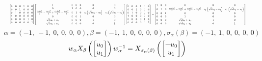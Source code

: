 \documentclass[11pt]{article}
\theoremstyle{definition}
\begin{document}
\[
\scaletoalign{\textwidth}{{\left[\begin{matrix}0 & 0 & 0 & 1 & 0 & 0\\0 & 0 & 1 & 0 & 0 & 0\\0 & 1 & 0 & 0 & 0 & 0\\1 & 0 & 0 & 0 & 0 & 0\\0 & 0 & 0 & 0 & 1 & 0\\0 & 0 & 0 & 0 & 0 & 1\end{matrix}\right]} {\left[\begin{matrix}1 & 0 & 0 & 0 & 0 & 0\\0 & 1 & 0 & 0 & 0 & 0\\\frac{c_{0} d u_{0}^{2}}{2} - \frac{c_{0} u_{2}^{2}}{2} + \frac{c_{1} d u_{3}^{2}}{2} - \frac{c_{1} u_{1}^{2}}{2} & 0 & 1 & 0 & c_{0} \left(\sqrt{d} u_{0} - u_{2}\right) & c_{1} \left(\sqrt{d} u_{3} - u_{1}\right)\\0 & 0 & 0 & 1 & 0 & 0\\\sqrt{d} u_{0} + u_{2} & 0 & 0 & 0 & 1 & 0\\\sqrt{d} u_{3} + u_{1} & 0 & 0 & 0 & 0 & 1\end{matrix}\right]} {\left[\begin{matrix}0 & 0 & 0 & 1 & 0 & 0\\0 & 0 & 1 & 0 & 0 & 0\\0 & 1 & 0 & 0 & 0 & 0\\1 & 0 & 0 & 0 & 0 & 0\\0 & 0 & 0 & 0 & 1 & 0\\0 & 0 & 0 & 0 & 0 & 1\end{matrix}\right]} = {\left[\begin{matrix}1 & 0 & 0 & 0 & 0 & 0\\0 & 1 & 0 & \frac{c_{0} d u_{0}^{2}}{2} - \frac{c_{0} u_{2}^{2}}{2} + \frac{c_{1} d u_{3}^{2}}{2} - \frac{c_{1} u_{1}^{2}}{2} & c_{0} \left(\sqrt{d} u_{0} - u_{2}\right) & c_{1} \left(\sqrt{d} u_{3} - u_{1}\right)\\0 & 0 & 1 & 0 & 0 & 0\\0 & 0 & 0 & 1 & 0 & 0\\0 & 0 & 0 & \sqrt{d} u_{0} + u_{2} & 1 & 0\\0 & 0 & 0 & \sqrt{d} u_{3} + u_{1} & 0 & 1\end{matrix}\right]}}
\]
\[
\alpha = \left( -1, \  -1, \  0, \  0, \  0, \  0\right), \beta = \left( -1, \  1, \  0, \  0, \  0, \  0\right), \sigma_{\alpha}(\beta) = \left( -1, \  1, \  0, \  0, \  0, \  0\right)
\]
\[
\scaletoalign{\textwidth}{w_{\alpha} X_{\beta}\left(\left[\begin{matrix}u_{0}\\u_{1}\end{matrix}\right]\right) w_{\alpha}^{-1} = X_{\sigma_{\alpha}\left(\beta\right)}\left(\left[\begin{matrix}- u_{0}\\u_{1}\end{matrix}\right]\right)}
\]
\end{document}
